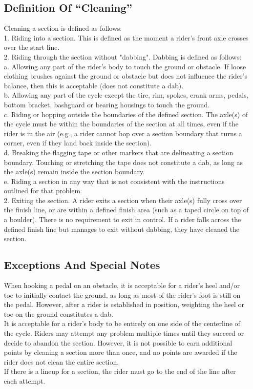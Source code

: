\subsection{Definition Of “Cleaning”}
Cleaning a section is defined as follows:\\
1. Riding into a section. This is defined as the moment a rider's front axle crosses over the start line.\\
2. Riding through the section without "dabbing". Dabbing is defined as follows:\\
a. Allowing any part of the rider's body to touch the ground or obstacle. If loose clothing brushes against the ground or obstacle but does not influence the rider's balance, then this is acceptable (does not constitute a dab).\\
b. Allowing any part of the cycle except the tire, rim, spokes, crank arms, pedals, bottom bracket, bashguard or bearing housings to touch the ground.\\
c. Riding or hopping outside the boundaries of the defined section. The axle(s) of the cycle must be within the boundaries of the section at all times, even if the rider is in the air (e.g., a rider cannot hop over a section boundary that turns a corner, even if they land back inside the section).\\
d. Breaking the flagging tape or other markers that are delineating a section boundary. Touching or stretching the tape does not constitute a dab, as long as the axle(s) remain inside the section boundary.\\
e. Riding a section in any way that is not consistent with the instructions outlined for that problem.\\
2. Exiting the section. A rider exits a section when their axle(s) fully cross over the finish line, or are within a
defined finish area (such as a taped circle on top of a boulder). There is no requirement to exit in control. If a rider
falls across the defined finish line but manages to exit without dabbing, they have cleaned the section.
\subsection{Exceptions And Special Notes}
When hooking a pedal on an obstacle, it is acceptable for a rider's heel and/or toe to initially contact the ground, as long
as most of the rider's foot is still on the pedal. However, after a rider is established in position, weighting the heel or toe
on the ground constitutes a dab.\\
It is acceptable for a rider’s body to be entirely on one side of the centerline of the cycle.
Riders may attempt any problem multiple times until they succeed or decide to abandon the section. However, it is not
possible to earn additional points by cleaning a section more than once, and no points are awarded if the rider does not
clean the entire section.\\
If there is a lineup for a section, the rider must go to the end of the line after each attempt.
